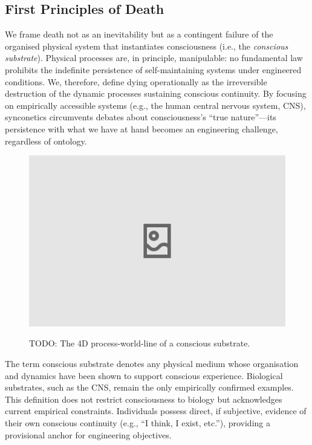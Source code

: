 \documentclass[10pt]{article}
\begin{document}
\begin{sloppypar}
  \subsection{First Principles of Death}
  \label{sec:first-principles}

  We frame death not as an inevitability but as a contingent failure of the organised physical system that instantiates consciousness (i.e., the \emph{conscious substrate}). Physical processes are, in principle, manipulable: no fundamental law prohibits the indefinite persistence of self-maintaining systems under engineered conditions. We, therefore, define dying operationally as the irreversible destruction of the dynamic processes sustaining conscious continuity. By focusing on empirically accessible systems (e.g., the human central nervous system, CNS), synconetics circumvents debates about consciousness’s “true nature”—its persistence with what we have at hand becomes an engineering challenge, regardless of ontology.

  \begin{figure}[ht!]
    \centering
    \includegraphics[width=\textwidth]{figures/4D-process-world-line.png}
    \label{fig:process-world-line}
    \caption{TODO: The 4D process-world-line of a conscious substrate.}
  \end{figure}

  The term conscious substrate denotes any physical medium whose organisation and dynamics have been shown to support conscious experience. Biological substrates, such as the CNS, remain the only empirically confirmed examples. This definition does not restrict consciousness to biology but acknowledges current empirical constraints. Individuals possess direct, if subjective, evidence of their own conscious continuity (e.g., “I think, I exist, etc.”), providing a provisional anchor for engineering objectives.


\end{sloppypar}
\end{document}
